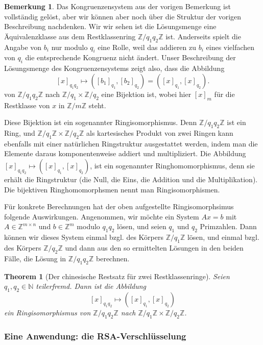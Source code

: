 \documentclass[
a4paper,12pt,
bibliography=totocnumbered,
numbers=noenddot,
]{scrartcl}
\numberwithin{equation}{subsection}
\newcommand{\N}{\mathbb N}
\newcommand{\Z}{\mathbb Z}
\theoremstyle{plain}
\newtheorem*{thm}{Theorem}
\theoremstyle{definition}
\newtheorem*{bem}{Bemerkung}
\begin{document}
\begin{bem}
	Das Kongruenzensystem aus der vorigen Bemerkung ist vollständig gelöst, aber wir können aber noch über die Struktur der vorigen Beschreibung nachdenken. 
	Wir wir sehen ist die Lösungsmenge eine Äquivalenzklasse aus dem Restklassenring $\Z/ q_1 q_2 \Z$ ist. Anderseits spielt die Angabe von $b_i$ nur modulo $q_i$ eine Rolle, weil das addieren zu $b_i$ eines vielfachen von $q_i$ die entsprechende Kongruenz nicht ändert. Unser Beschreibung der Lösungsmenge des Kongruenzensystems zeigt also, dass die Abbildung 
	\[
	[x]_{q_1 q_2} \mapsto ([b_1]_{q_1}, [b_2]_{q_2}) = ([x]_{q_1},[x]_{q_2}). 
	\]
	von $\Z / q_1 q_2 \Z$ nach $\Z / q_1 \times \Z/ q_2$ eine Bijektion ist, wobei hier $[x]_m$ für die Restklasse von $x$ in $\Z/ m \Z$ steht. 
	
	Diese Bijektion ist ein sogenannter Ringisomorphismus. Denn $\Z / q_1q_2 \Z$ ist ein Ring, und $\Z  / q_1 \Z \times \Z / q_2 \Z$ als kartesisches Produkt von zwei Ringen kann ebenfalls mit einer natürlichen Ringstruktur ausgestattet werden, indem man die Elemente daraus komponentenweise addiert und multipliziert. Die Abbildung $[x]_{q_1 q_2} \mapsto ([x]_{q_1} , [x]_{q_2})$, ist ein sogenannter Ringhomomorphismus, denn sie erhält die Ringstruktur (die Null, die Eins, die Addition und die Multiplikation). Die bijektiven Ringhomomorphsmen nennt man Ringisomorphismen. 
	
	Für konkrete Berechnungen hat der oben aufgestellte Ringisomorphsimus folgende Auswirkungen. Angenommen, wir möchte ein System $A x =b$ mit $A \in \Z^{m \times n}$ und $b \in \Z^m$ modulo $q_1 q_2$ lösen, und seien $q_1$ und $q_2$ Primzahlen. Dann können wir dieses System einmal bzgl. des Körpers $ \Z / q_1 \Z$ lösen, und einmal bzgl. des Körpers $\Z / q_2 \Z$ und dann aus den so ermittelten Lösungen in den beiden Fälle, die Lösung in $\Z / q_1 q_2 \Z$ berechnen. 
\end{bem} 


\begin{thm}[Der chinesische Restsatz für zwei Restklassenringe] 
	Seien $q_1, q_2 \in \N$ teilerfremd. Dann ist die Abbildung 
	\[
			[x]_{q_1 q_2} \mapsto ([x]_{q_1}, [x]_{q_2})
	\]
	ein Ringisomorphismus von $\Z / q_1 q_2 \Z$ nach $\Z / q_1 \Z \times \Z / q_2 \Z$. 
\end{thm}

\subsubsection{Eine Anwendung: die RSA-Verschlüsselung}
\end{document}
